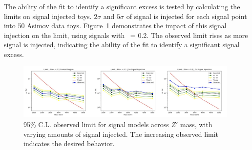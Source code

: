 The ability of the fit to identify a significant excess is tested by calculating the limits on signal injected toys. $2\sigma$ and $5\sigma$ of signal is injected for each signal point into 50 Asimov data toys.
Figure~\ref{fig:lim_sig_inj} demonstrates the impact of this signal injection on the limit, using signals with \rinv~= 0.2.
The observed limit rises as more signal is injected, indicating the ability of the fit to identify a significant signal excess. 

\begin{figure}[!htbp]
\centering
   \includegraphics[width=0.98\textwidth]{figures/stats/lim_sig_inj}
    \caption{95\% C.L. observed limit for signal models across $Z'$ mass, with varying amounts of signal injected. The increasing observed limit indicates the desired behavior.
    \label{fig:lim_sig_inj}}
\end{figure}

\clearpage
